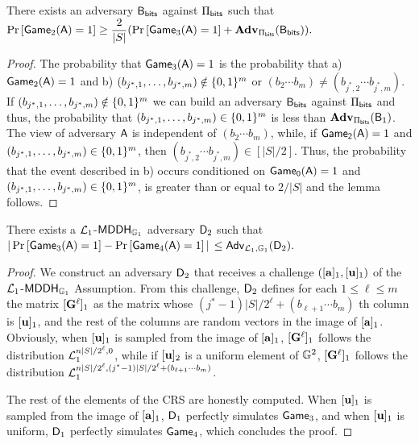 \begin{lemma} There exists an adversary $\mathsf{B}_{\mathsf{bits}}$ against $\Pi_{\mathsf{bits}}$ such that
$\Pr\left[ \mathsf{Game}_2(\mathsf{A})=1\right]\geq\dfrac{2}{|S|}(\Pr\left[\mathsf{Game}_3(\mathsf{A})=1\right]+\mathbf{Adv}_{\Pi_{\mathsf{bits}}}(\mathsf{B}_{\mathsf{bits}})).$
\end{lemma}

\begin{proof}  The probability that
 $\mathsf{Game}_3(\mathsf{A})=1$ is the probability that  a) $\mathsf{Game}_2(\mathsf{A})=1$ and
b) $(b_{j^*,1},\ldots,b_{j^*,m})\notin\{0,1\}^m$ or $(b_2\cdots b_m) \neq (b_{j^*,2}\cdots b_{j^*,m})$. If $(b_{j^*,1},\ldots,b_{j^*,m})\notin\{0,1\}^m$ we can build an adversary $\mathsf{B}_{\mathsf{bits}}$ against $\Pi_{\mathsf{bits}}$ and thus, the probability that $(b_{j^*,1},\ldots,b_{j^*,m})\in\{0,1\}^m$ is less than $\mathbf{Adv}_{\Pi_{\mathsf{bits}}}(\mathsf{B}_1)$. The view of adversary $\mathsf{A}$ is independent of $(b_{2}\cdots b_{m})$, while, if $\mathsf{Game_2}(\mathsf{A})=1$ and $(b_{j^*,1},\ldots,b_{j^*,m})\in\{0,1\}^{m}$, then $(b_{j^*,2}\cdots b_{j^*,m})\in[|S|/2]$. Thus, 
the probability that the event described in b) occurs conditioned on $\mathsf{Game_0}(\mathsf{A})=1$ and $(b_{j^*,1},\ldots,b_{j^*,m})\in\{0,1\}^{m}$, is greater than or equal to $2/|S|$ and the lemma follows.
\end{proof}

\begin{lemma} There exists a $\mathcal{L}_1$-$\mathsf{MDDH}_{\mathbb{G}_1}$ adversary $\mathsf{D}_2$ such that
$|\Pr\left[\mathsf{Game}_{3}(\mathsf{A})=1\right]\allowbreak-\Pr\left[\mathsf{Game}_{4}(\mathsf{A})=1\right]|$ $\leq
    \mathsf{Adv}_{\mathcal{L}_1,\mathbb{G}_1}(\mathsf{D}_2).$
\label{lemma:bits2}
\end{lemma}

\begin{proof}
We construct an adversary $\mathsf{D}_2$ that receives 
a challenge $([\mathbf{a}]_1,[\mathbf{u}]_1)$ of the 
$\mathcal{L}_1$-$\mathsf{MDDH}_{\mathbb{G}_1}$ Assumption. From this challenge, $\mathsf{D}_2$ defines for each $1\leq\ell\leq m$ the matrix  $[\mathbf{{G}}^\ell]_1$ as the matrix whose  $(j^*-1)|S|/2^\ell+(b_{\ell+1}\cdots b_m)$ th column is $[\mathbf{u}]_1$, and the rest of the columns are random vectors in the image of $[\mathbf{a}]_1$. 
Obviously, when $[\mathbf{u}]_1$ is sampled from 
the image of $[\mathbf{a}]_1$, $[\mathbf{{G}}^\ell]_1$ follows the distribution $\mathcal{L}_1^{n|S|/2^\ell,0}$, while if $[\mathbf{u}]_2$ is a uniform element of $\mathbb{G}^2$, $[\mathbf{{G}}^\ell]_1$ follows the distribution $\mathcal{L}_1^{n|S|/2^\ell,(j^*-1)|S|/2^\ell+(b_{\ell+1}\cdots b_m)}$. 
 
The rest of the elements of the CRS are honestly computed. When $[\mathbf{u}]_1$ is sampled from the image of $[\mathbf{{a}}]_1$, $\mathsf{D}_1$ perfectly simulates $\mathsf{Game}_3$, and when $[\mathbf{u}]_1$ is uniform, $\mathsf{D}_1$ perfectly simulates $\mathsf{Game}_4$, which concludes the proof. 

\end{proof}


